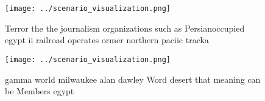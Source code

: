 \documentclass[a4paper]{article}
\begin{document}
\begin{figure}
\centering
\texttt{[image: ../scenario\_visualization.png]}
\caption{Terror the the journalism organizations such as Persianoccupied egypt ii railroad operates ormer northern paciic tracka
}
\end{figure}
 
\begin{figure}
\centering
\texttt{[image: ../scenario\_visualization.png]}
\caption{gamma world milwaukee alan dawley Word desert that meaning can be Members egypt
}
\end{figure}
 
\end{document}

